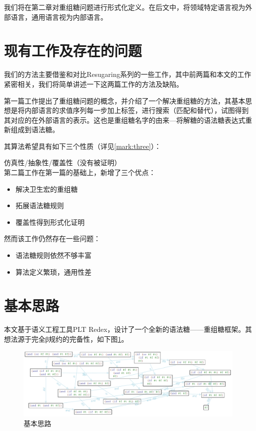 我们将在第二章对重组糖问题进行形式化定义。在后文中，将领域特定语言视为外部语言，通用语言视为内部语言。

\section{现有工作及存在的问题}
我们的方法主要借鉴和对比Resugaring系列\cite{resugaring}\cite{hygienic}\cite{resugaringscpoe}\cite{resugaringtype}的一些工作，其中前两篇和本文的工作紧密相关，我们将简单讲述一下这两篇工作的方法及缺陷。

第一篇工作提出了重组糖问题的概念，并介绍了一个解决重组糖的方法，其基本思想是将内部语言的求值序列每一步加上标签，进行搜索（匹配和替代），试图得到其对应的在外部语言的表示。这也是重组糖名字的由来---将解糖的语法糖表达式重新组成到语法糖。

其算法希望具有如下三个性质（详见\ref{mark:three}）：

仿真性/抽象性/覆盖性（没有被证明）
\\[12pt]

第二篇工作在第一篇的基础上，新增了三个优点：

\begin{itemize}
	\item 解决卫生宏的重组糖
	\item 拓展语法糖规则
	\item 覆盖性得到形式化证明
\end{itemize}

然而该工作仍然存在一些问题：
\begin{itemize}
	\item 语法糖规则依然不够丰富
	\item 算法定义繁琐，通用性差
\end{itemize}

\section{基本思路}

本文基于语义工程工具PLT Redex\cite{SEwPR}，设计了一个全新的语法糖——重组糖框架。其想法源于完全β规约的完备性，如下图\ref{fig:base}。

\begin{figure}[ht]
	\centering
	\includegraphics[width=12cm]{images/chapter1/example.png}
	\caption{基本思路}
	\label{fig:base}
\end{figure}

